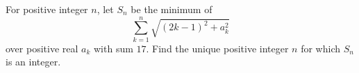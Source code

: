 For positive integer $n$, let $S_n$ be the minimum of
\[
\sum_{k=1}^n\sqrt{(2k-1)^2+a_k^2}
\]
over positive real $a_k$ with sum $17$. Find the unique positive integer $n$ for which $S_n$ is an integer.
